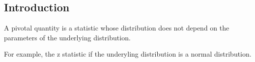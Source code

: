 
\subsection{Introduction}

A pivotal quantity is a statistic whose distribution does not depend on the parameters of the underlying distribution.

For example, the z statistic if the underyling distribution is a normal distribution.

